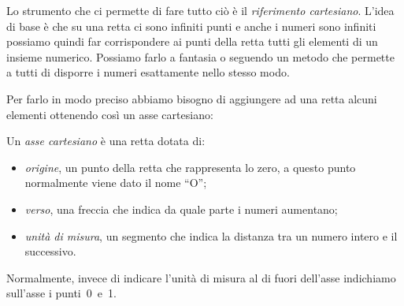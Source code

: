 Lo strumento che ci permette di fare tutto ciò è il 
\emph{riferimento cartesiano}. L'idea di base è che su una retta ci sono 
infiniti punti e anche i numeri sono infiniti possiamo quindi far 
corrispondere ai punti della retta tutti gli elementi di un insieme numerico.
Possiamo farlo a fantasia o seguendo un metodo che permette a tutti di 
disporre i numeri esattamente nello stesso modo.

\begin{inaccessibleblock}
 \begin{figure}[h]
 \centering
 \begin{minipage}[t]{.45\textwidth}
  \centering \assea
 \end{minipage}\hfil
 \begin{minipage}[t]{.45\textwidth}
  \centering \asseb
 \end{minipage}
\end{figure}
\end{inaccessibleblock}

Per farlo in modo preciso abbiamo bisogno di aggiungere ad una retta alcuni 
elementi ottenendo così un asse cartesiano:

\begin{definizione}
  Un \emph{asse cartesiano} è una retta dotata di:
  \begin{itemize} [noitemsep]
   \item \emph{origine}, un punto della retta che rappresenta lo zero, 
    a questo punto normalmente viene dato il nome ``O'';
   \item \emph{verso}, una freccia che indica da quale parte i numeri 
    aumentano;
   \item \emph{unità di misura}, un segmento che indica la distanza tra 
    un numero intero e il successivo.
  \end{itemize}
\end{definizione}


\begin{center} \assec \end{center}

Normalmente, invece di indicare l'unità di misura al di fuori dell'asse
indichiamo sull'asse i punti~0~e~1. 


